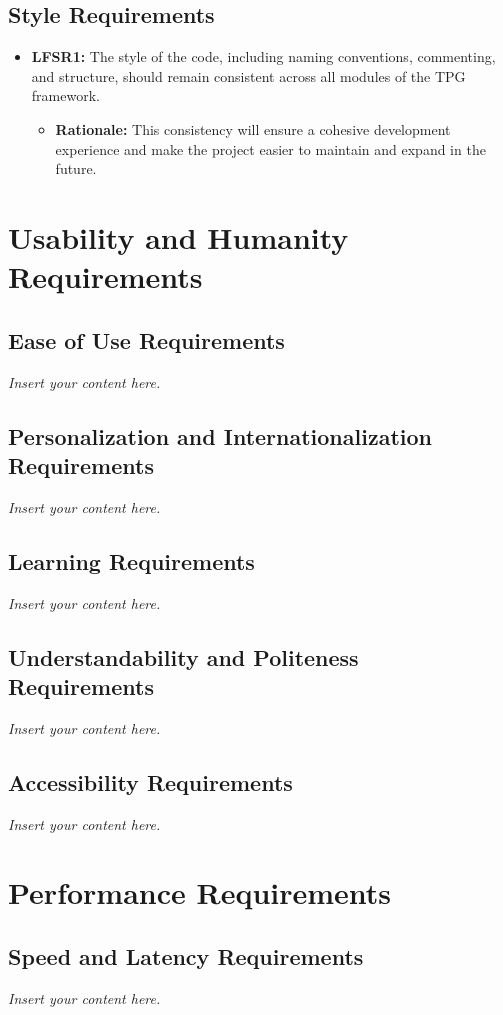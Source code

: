 \documentclass[12pt]{article}
\newcommand{\lips}{\textit{Insert your content here.}}
\begin{document}
\subsection{Style Requirements}


\begin{itemize}
  \item \textbf{LFSR1:}  The style of the code, including naming conventions, commenting, and structure, should remain consistent across all modules of the TPG framework.

      \begin{itemize}
        \item \textbf{Rationale:} This consistency will ensure a cohesive development experience and make the project easier to maintain and expand in the future.
      \end{itemize}
\end{itemize}


\section{Usability and Humanity Requirements}
\subsection{Ease of Use Requirements}
\lips
\subsection{Personalization and Internationalization Requirements}
\lips
\subsection{Learning Requirements}
\lips
\subsection{Understandability and Politeness Requirements}
\lips
\subsection{Accessibility Requirements}
\lips

\section{Performance Requirements}
\subsection{Speed and Latency Requirements}
\lips
\end{document}
